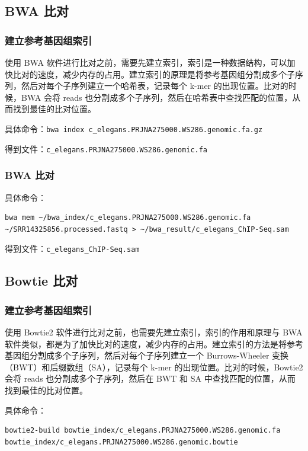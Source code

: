 \documentclass[UTF8]{ctexart}
\begin{document}
\subsection{BWA 比对}

\subsubsection{建立参考基因组索引}

使用 BWA 软件进行比对之前，需要先建立索引，索引是一种数据结构，可以加快比对的速度，减少内存的占用。建立索引的原理是将参考基因组分割成多个子序列，然后对每个子序列建立一个哈希表，记录每个 k-mer 的出现位置。比对的时候，BWA 会将 reads 也分割成多个子序列，然后在哈希表中查找匹配的位置，从而找到最佳的比对位置。

具体命令：\verb|bwa index c_elegans.PRJNA275000.WS286.genomic.fa.gz|

得到文件：\verb|c_elegans.PRJNA275000.WS286.genomic.fa|

\subsubsection{BWA 比对}

具体命令：

\begin{lstlisting}
bwa mem ~/bwa_index/c_elegans.PRJNA275000.WS286.genomic.fa ~/SRR14325856.processed.fastq > ~/bwa_result/c_elegans_ChIP-Seq.sam
\end{lstlisting}

得到文件：\verb|c_elegans_ChIP-Seq.sam|

\subsection{Bowtie 比对}

\subsubsection{建立参考基因组索引}

使用 Bowtie2 软件进行比对之前，也需要先建立索引，索引的作用和原理与 BWA 软件类似，都是为了加快比对的速度，减少内存的占用。建立索引的方法是将参考基因组分割成多个子序列，然后对每个子序列建立一个 Burrows-Wheeler 变换（BWT）和后缀数组（SA），记录每个 k-mer 的出现位置。比对的时候，Bowtie2 会将 reads 也分割成多个子序列，然后在 BWT 和 SA 中查找匹配的位置，从而找到最佳的比对位置。

具体命令：

\begin{lstlisting}
bowtie2-build bowtie_index/c_elegans.PRJNA275000.WS286.genomic.fa bowtie_index/c_elegans.PRJNA275000.WS286.genomic.bowtie
\end{lstlisting}
\end{document}
